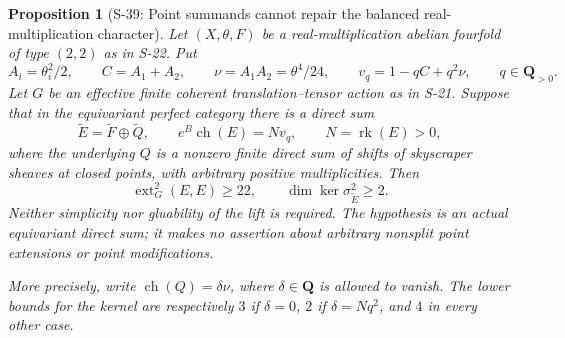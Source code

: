 \documentclass[11pt,a4paper]{article}
\newtheorem{proposition}[theorem]{Proposition}
\theoremstyle{definition}
\begin{document}
\begin{proposition}[S-39: Point summands cannot repair the balanced real-multiplication character]
\label{prop:semireg-rm-point-augmentation}
Let $(X,\theta,F)$ be a real-multiplication abelian fourfold of type
$(2,2)$ as in S-22. Put
\[
 A_i=\theta_i^2/2,\qquad C=A_1+A_2,\qquad
 \nu=A_1A_2=\theta^4/24,
 \qquad v_q=1-qC+q^2\nu,
 \qquad q\in\mathbf Q_{>0}.
\]
Let $G$ be an effective finite coherent translation--tensor action as in
S-21. Suppose that in the equivariant perfect category there is a direct sum
\[
 \widetilde E=\widetilde F\oplus\widetilde Q,
 \qquad e^B\operatorname{ch}(E)=Nv_q,
 \qquad N=\operatorname{rk}(E)>0,
 \tag{S39.1}
\]
where the underlying $Q$ is a nonzero finite direct sum of shifts of
skyscraper sheaves at closed points, with arbitrary positive multiplicities.
Then
\[
 \operatorname{ext}^2_G(E,E)\ge22,
 \qquad \dim\ker\sigma^2_{\widetilde E}\ge2.
 \tag{S39.2}
\]
Neither simplicity nor gluability of the lift is required. The hypothesis
is an actual equivariant direct sum; it makes no assertion about arbitrary
nonsplit point extensions or point modifications.

More precisely, write $\operatorname{ch}(Q)=\delta\nu$, where
$\delta\in\mathbf Q$ is allowed to vanish. The lower bounds for the
kernel are respectively $3$ if $\delta=0$, $2$ if
$\delta=Nq^2$, and $4$ in every other case.
\end{proposition}
\end{document}

